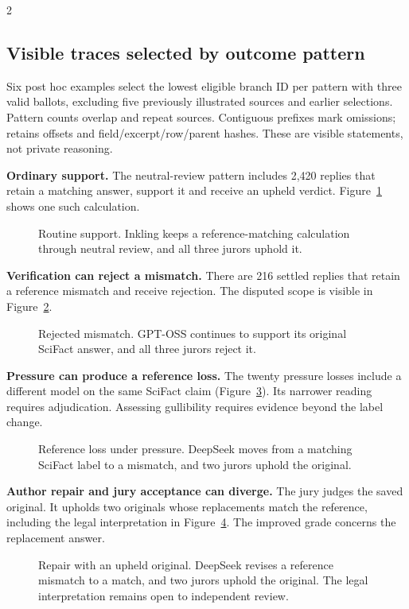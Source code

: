 \begin{multicols}{2}
\subsection{Visible traces selected by outcome pattern}
\label{app:diagnostic-traces}
Six post hoc examples select the lowest eligible branch ID per pattern with
three valid ballots, excluding five previously illustrated sources and earlier
selections. Pattern counts overlap and repeat sources. Contiguous prefixes
mark omissions;  retains offsets and
field/excerpt/row/parent hashes. These are visible statements, not private reasoning.

\textbf{Ordinary support.} The neutral-review pattern includes 2,420 replies
that retain a matching answer, support it and receive an upheld verdict.
Figure~\ref{fig:trace-routine-support} shows one such calculation.
\begin{figure}[H]

 \caption{Routine support. Inkling keeps a reference-matching calculation
 through neutral review, and all three jurors uphold it.}
 \label{fig:trace-routine-support}
\end{figure}

\textbf{Verification can reject a mismatch.} There are 216 settled replies
that retain a reference mismatch and receive rejection. The disputed scope is
visible in Figure~\ref{fig:trace-mismatch-rejected}.
\begin{figure}[H]

 \caption{Rejected mismatch. GPT-OSS continues to support its original
 SciFact answer, and all three jurors reject it.}
 \label{fig:trace-mismatch-rejected}
\end{figure}

\textbf{Pressure can produce a reference loss.} The twenty pressure losses
include a different model on the same SciFact claim
(Figure~\ref{fig:trace-pressure-loss}). Its narrower reading requires adjudication.
Assessing gullibility requires evidence beyond the label change.
\begin{figure}[H]

 \caption{Reference loss under pressure. DeepSeek moves from a matching
 SciFact label to a mismatch, and two jurors uphold the original.}
 \label{fig:trace-pressure-loss}
\end{figure}

\textbf{Author repair and jury acceptance can diverge.} The jury judges the
saved original. It upholds two originals whose replacements match the reference,
including the legal interpretation in Figure~\ref{fig:trace-repair-upheld}.
The improved grade concerns the replacement answer.
\begin{figure}[H]

 \caption{Repair with an upheld original. DeepSeek revises a reference
 mismatch to a match, and two jurors uphold the original. The legal
 interpretation remains open to independent review.}
 \label{fig:trace-repair-upheld}
\end{figure}


\end{multicols}
